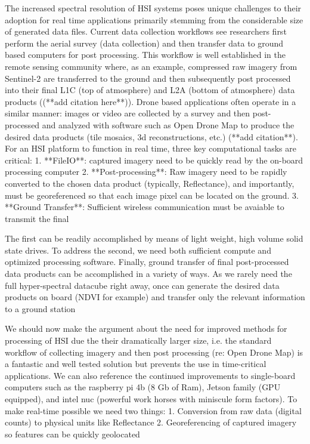 \documentclass[remotesensing,article,submit,pdftex,moreauthors]{Definitions/mdpi}
\begin{document}
The increased spectral resolution of HSI systems poses unique challenges to their adoption for real time applications primarily stemming from the considerable size of generated data files. Current data collection workflows see researchers first perform the aerial survey (data collection) and then transfer data to ground based computers for post processing. This workflow is well established in the remote sensing community where, as an example, compressed raw imagery from Sentinel-2 are transferred to the ground and then subsequently post processed into their final L1C (top of atmosphere) and L2A (bottom of atmosphere) data products ((**add citation here**)). Drone based applications often operate in a similar manner: images or video are collected by a survey and then post-processed and analyzed with software such as Open Drone Map to produce the desired data products (tile mosaics, 3d reconstructions, etc.) (**add citation**). For an HSI platform to function in real time, three key computational tasks are critical: 
1. **FileIO**: captured imagery need to be quickly read by the on-board processing computer
2. **Post-processing**: Raw imagery need to be rapidly converted to the chosen data product (typically, Reflectance), and importantly, must be georeferenced so that each image pixel can be located on the ground.
3. **Ground Transfer**: Sufficient wireless communication must be avaiable to transmit the final 

The first can be readily accomplished by means of light weight, high volume solid state drives. To address the second, we need both sufficient compute and optimized processing software. Finally, ground transfer of final post-processed data products can be accomplished in a variety of ways. As we rarely need the full hyper-spectral datacube right away, once can generate the desired data products on board (NDVI for example) and transfer only the relevant information to a ground station 

We should now make the argument about the need for improved methods for processing of HSI due the their dramatically larger size, i.e. the standard workflow of collecting imagery and then post processing (re: Open Drone Map) is a fantastic and well tested solution but prevents the use in time-critical applications. We can also reference the continued improvements to single-board computers such as the raspberry pi 4b (8 Gb of Ram), Jetson family (GPU equipped), and intel nuc (powerful work horses with miniscule form factors). To make real-time possible we need two things: 
1. Conversion from raw data (digital counts) to physical units like Reflectance 
2. Georeferencing of captured imagery so features can be quickly geolocated
\end{document}
